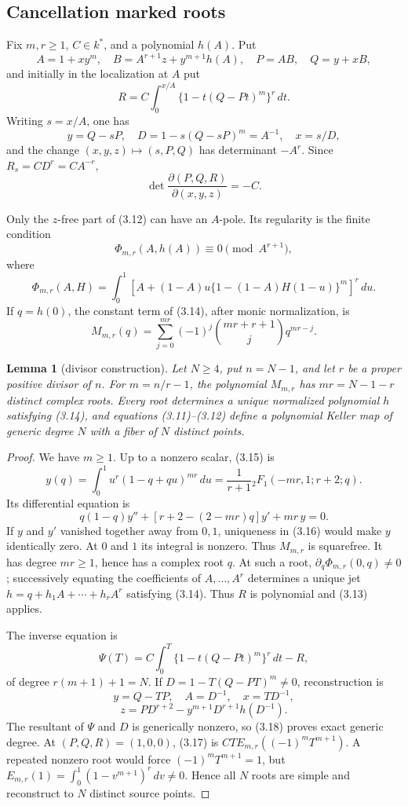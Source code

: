 \documentclass[11pt]{article}
\newtheorem{lemma}[theorem]{Lemma}
\begin{document}
\subsection{Cancellation marked roots}

Fix $m,r\ge1$, $C\in k^*$, and a polynomial $h(A)$.  Put
\[
 A=1+xy^m,\quad B=A^{r+1}z+y^{m+1}h(A),\quad
 P=AB,\quad Q=y+xB,                                     \tag{3.11}
\]
and initially in the localization at $A$ put
\[
 R=C\int_0^{x/A}\{1-t(Q-Pt)^m\}^r\,dt.                 \tag{3.12}
\]
Writing $s=x/A$, one has
\[
 y=Q-sP,\quad D=1-s(Q-sP)^m=A^{-1},\quad x=s/D,
\]
and the change $(x,y,z)\mapsto(s,P,Q)$ has determinant $-A^r$.
Since $R_s=CD^r=CA^{-r}$,
\[
 \det\frac{\partial(P,Q,R)}{\partial(x,y,z)}=-C.        \tag{3.13}
\]

Only the $z$-free part of (3.12) can have an $A$-pole.  Its regularity is the
finite condition
\[
 \Phi_{m,r}(A,h(A))\equiv0\pmod {A^{r+1}},               \tag{3.14}
\]
where
\[
 \Phi_{m,r}(A,H)=\int_0^1
 [A+(1-A)u\{1-(1-A)H(1-u)\}^m]^r\,du.
\]
If $q=h(0)$, the constant term of (3.14), after monic normalization, is
\[
 M_{m,r}(q)=\sum_{j=0}^{mr}(-1)^j
 \binom{mr+r+1}{j}q^{mr-j}.                              \tag{3.15}
\]

\begin{lemma}[divisor construction]\label{lem:cancellation}
Let $N\ge4$, put $n=N-1$, and let $r$ be a proper positive divisor of $n$.
For $m=n/r-1$, the polynomial $M_{m,r}$ has $mr=N-1-r$ distinct complex
roots.  Every root determines a unique normalized polynomial $h$ satisfying
(3.14), and equations (3.11)--(3.12) define a polynomial Keller map of
generic degree $N$ with a fiber of $N$ distinct points.
\end{lemma}

\begin{proof}
We have $m\ge1$.  Up to a nonzero scalar, (3.15) is
\[
 y(q)=\int_0^1u^r(1-q+qu)^{mr}\,du
 =\frac1{r+1}{}_2F_1(-mr,1;r+2;q).
\]
Its differential equation is
\[
 q(1-q)y''+[r+2-(2-mr)q]y'+mr\,y=0.                     \tag{3.16}
\]
If $y$ and $y'$ vanished together away from $0,1$, uniqueness in (3.16)
would make $y$ identically zero.  At $0$ and $1$ its integral is nonzero.
Thus $M_{m,r}$ is squarefree.  It has degree $mr\ge1$, hence has a complex
root $q$.  At such a root, $\partial_q\Phi_{m,r}(0,q)\ne0$; successively
equating the coefficients of $A,\ldots,A^r$ determines a unique jet
$h=q+h_1A+\cdots+h_rA^r$ satisfying (3.14).  Thus $R$ is polynomial and
(3.13) applies.

The inverse equation is
\[
 \Psi(T)=C\int_0^T\{1-t(Q-Pt)^m\}^r\,dt-R,              \tag{3.17}
\]
of degree $r(m+1)+1=N$.  If
$D=1-T(Q-PT)^m\ne0$, reconstruction is
\[
 y=Q-TP,\quad A=D^{-1},\quad x=TD^{-1},
\]
\[
 z=PD^{r+2}-y^{m+1}D^{r+1}h(D^{-1}).                    \tag{3.18}
\]
The resultant of $\Psi$ and $D$ is generically nonzero, so (3.18) proves
exact generic degree.  At $(P,Q,R)=(1,0,0)$, (3.17) is
$CTE_{m,r}((-1)^mT^{m+1})$.  A repeated nonzero root would force
$(-1)^mT^{m+1}=1$, but
$E_{m,r}(1)=\int_0^1(1-v^{m+1})^r\,dv\ne0$.  Hence all $N$ roots are simple
and reconstruct to $N$ distinct source points.
\end{proof}
\end{document}
